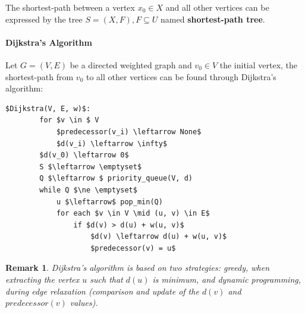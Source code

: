 \documentclass[12pt]{report}
\newtheorem{remark}{Remark}[section]
\begin{document}
The shortest-path between a vertex $x_0 \in X$ and all other vertices can be expressed by the tree $S=(X, F), F \subseteq U$ named \textbf{shortest-path tree}.

\paragraph{Dijkstra's Algorithm \cite{cor2011}}

Let $G=(V, E)$ be a directed weighted graph and $v_0 \in V$ the initial vertex, the shortest-path from $v_0$ to all other vertices can be found through Dijkstra's algorithm:

\begin{lstlisting}[mathescape]
    $Dijkstra(V, E, w)$:
        for $v \in $ V
            $predecessor(v_i) \leftarrow None$
            $d(v_i) \leftarrow \infty$
        $d(v_0) \leftarrow 0$
        S $\leftarrow \emptyset$
        Q $\leftarrow $ priority_queue(V, d)
        while Q $\ne \emptyset$
            u $\leftarrow$ pop_min(Q)
            for each $v \in V \mid (u, v) \in E$
                if $d(v) > d(u) + w(u, v)$
                    $d(v) \leftarrow d(u) + w(u, v)$
                    $predecessor(v) = u$
\end{lstlisting}

\begin{remark}
	Dijkstra's algorithm is based on two strategies: greedy, when extracting the vertex $u$ such that $d(u)$ is minimum, and dynamic programming, during edge relaxation (comparison and update of the $d(v)$ and $predecessor(v)$ values).
\end{remark}
\end{document}
